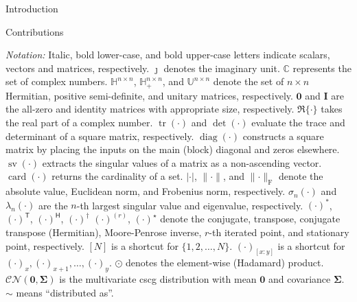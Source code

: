 \documentclass[journal]{IEEEtran}
\DeclareMathOperator{\diag}{diag}
\DeclareMathOperator{\tr}{tr}
\DeclareMathOperator{\sv}{sv}
\DeclareMathOperator{\card}{card}
\begin{document}
\begin{section}{Introduction}
\begin{subsection}{Contributions}
	\end{subsection}

	\emph{Notation:}
	Italic, bold lower-case, and bold upper-case letters indicate scalars, vectors and matrices, respectively.
	$\jmath$ denotes the imaginary unit.
	$\mathbb{C}$ represents the set of complex numbers.
	$\mathbb{H}^{n \times n}$, $\mathbb{H}_+^{n \times n}$, and $\mathbb{U}^{n \times n}$ denote the set of $n \times n$ Hermitian, positive semi-definite, and unitary matrices, respectively.
	$\mathbf{0}$ and $\mathbf{I}$ are the all-zero and identity matrices with appropriate size, respectively.
	$\Re\{\cdot\}$ takes the real part of a complex number.
	$\tr(\cdot)$ and $\det(\cdot)$ evaluate the trace and determinant of a square matrix, respectively.
	$\diag(\cdot)$ constructs a square matrix by placing the inputs on the main (block) diagonal and zeros elsewhere.
	$\sv(\cdot)$ extracts the singular values of a matrix as a non-ascending vector.
	$\card(\cdot)$ returns the cardinality of a set.
	$\lvert \cdot \rvert$, $\lVert \cdot \rVert$, and $\lVert \cdot \rVert _\mathrm{F}$ denote the absolute value, Euclidean norm, and Frobenius norm, respectively.
	$\sigma_n(\cdot)$ and $\lambda_n(\cdot)$ are the $n$-th largest singular value and eigenvalue, respectively.
	$(\cdot)^*$, $(\cdot)^\mathsf{T}$, $(\cdot)^\mathsf{H}$, $(\cdot)^\dagger$ $(\cdot)^{(r)}$, $(\cdot)^{\star}$ denote the conjugate, transpose, conjugate transpose (Hermitian), Moore-Penrose inverse, $r$-th iterated point, and stationary point, respectively.
	$[N]$ is a shortcut for $\{1,2,\ldots,N\}$.
	$(\cdot)_{[x:y]}$ is a shortcut for $(\cdot)_x,(\cdot)_{x+1},\ldots,(\cdot)_y$.
	$\odot$ denotes the element-wise (Hadamard) product.
	$\mathcal{CN}(\mathbf{0}, \mathbf{\Sigma})$ is the multivariate \gls{cscg} distribution with mean $\mathbf{0}$ and covariance $\mathbf{\Sigma}$.
	$\sim$ means ``distributed as''.
\end{section}
\end{document}
